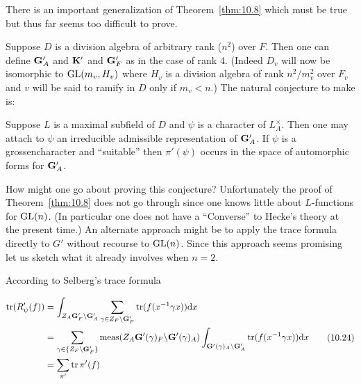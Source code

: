 \begin{remark}\label{rem:10.11}

There is an important generalization of Theorem~\ref{thm:10.8} which must be true but thus far seems too difficult to prove.

Suppose $D$ is a division algebra of arbitrary rank ($n^2$) over $F$. Then one can define $\mathbf{G}'_A$ and $\mathbf{K}'$ and $\mathbf{G}'_F$ as in the case of rank 4. (Indeed $D_v$ will now be isomorphic to $\operatorname{GL}(m_v, H_v)$ where $H_v$ is a division algebra of rank $n^2/m_v^2$ over $F_v$ and $v$ will be said to ramify in $D$ only if $m_v < n$.) The natural conjecture to make is:

\end{remark}

\begin{conjecture}\label{conj:10.12}

Suppose $L$ is a maximal subfield of $D$ and $\psi$ is a character of $L_A^{\times}$. Then one may attach to $\psi$ an irreducible admissible representation of $\mathbf{G}'_A$. If $\psi$ is a grossencharacter and ``suitable'' then $\pi'(\psi)$ occurs in the space of automorphic forms for $\mathbf{G}'_A$.

\end{conjecture}

How might one go about proving this conjecture? Unfortunately the proof of Theorem~\ref{thm:10.8} does not go through since one knows little about $L$-functions for $\operatorname{GL}(n)$. (In particular one does not have a ``Converse'' to Hecke's theory at the present time.) An alternate approach might be to apply the trace formula directly to $G'$ without recourse to $\operatorname{GL}(n)$. Since this approach seems promising let us sketch what it already involves when $n = 2$.

According to Selberg's trace formula

\begin{equation}\label{eq:10.24}
\begin{aligned}
\operatorname{tr}(R'_\psi(f)) &= \int_{Z_A \mathbf{G}'_F \backslash \mathbf{G}'_A} \sum_{\gamma \in Z_F \backslash \mathbf{G}'_F} \operatorname{tr}(f(x^{-1}\gamma x)) \mathrm{d} x\\
&= \sum_{\gamma \in \{Z_F \backslash \mathbf{G}'_F\}} \operatorname{meas}(Z_A \mathbf{G}'(\gamma)_F \backslash \mathbf{G}'(\gamma)_A) \int_{\mathbf{G}'(\gamma)_A \backslash \mathbf{G}'_A} \operatorname{tr}(f(x^{-1}\gamma x)) \mathrm{d} x\\
&= \sum_{\pi'} \operatorname{tr} \pi'(f)
\end{aligned}\tag{10.24}
\end{equation}

